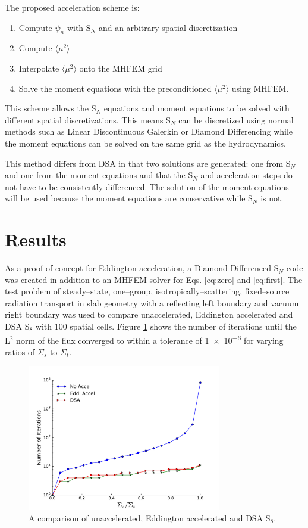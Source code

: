 \documentclass{anstrans}
\newcommand{\SN}{S$_N$\xspace}
\newcommand{\edd}{\langle \mu^2 \rangle}
\begin{document}
	The proposed acceleration scheme is: 
		\begin{enumerate}
			\item Compute $\psi_n$ with \SN and an arbitrary spatial discretization
			\item Compute $\edd$ 
			\item Interpolate $\edd$ onto the MHFEM grid 
			\item Solve the moment equations with the preconditioned $\edd$ using MHFEM. 
		\end{enumerate}
	This scheme allows the \SN equations and moment equations to be solved with different spatial discretizations. This means \SN can be discretized using normal methods such as Linear Discontinuous Galerkin or Diamond Differencing while the moment equations can be solved on the same grid as the hydrodynamics. 

	This method differs from DSA in that two solutions are generated: one from \SN and one from the moment equations and that the \SN and acceleration steps do not have to be consistently differenced. The solution of the moment equations will be used because the moment equations are conservative while \SN is not. 
	
\section{Results}
	As a proof of concept for Eddington acceleration, a Diamond Differenced \SN code was created in addition to an MHFEM solver for Eqs. \ref{eq:zero} and \ref{eq:first}. The test problem of steady--state, one--group, isotropically--scattering, fixed--source radiation transport in slab geometry with a reflecting left boundary and vacuum right boundary was used to compare unaccelerated, Eddington accelerated and DSA S$_8$ with 100 spatial cells. Figure \ref{fig:comparison} shows the number of iterations until the L$^2$ norm of the flux converged to within a tolerance of \num{1e-6} for varying ratios of $\Sigma_s$ to $\Sigma_t$. 


	\begin{figure}[ht] %
	  \centering
	  \includegraphics[width=8.5cm]{accel.pdf}
	  \caption{A comparison of unaccelerated, Eddington accelerated and DSA S$_8$. }
	  \label{fig:comparison}
	\end{figure}
\end{document}
